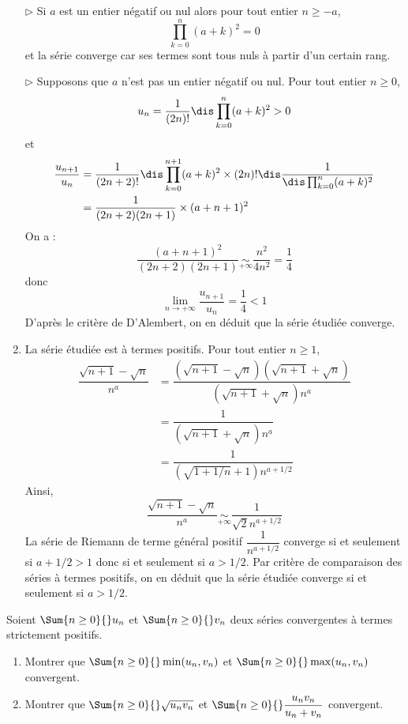 \documentclass[a4paper,twoside,french,10pt]{VcCours}
\begin{document}
\begin{enumerate}
\medskip

\noindent $\rhd$ Si $a$ est un entier négatif ou nul alors pour tout entier $n \geq -a$,
$$ \prod_{k=0}^n (a+k)^2 = 0$$
et la série converge car ses termes sont tous nuls à partir d'un certain rang.

\medskip

\noindent $\rhd$ Supposons que $a$ n'est pas un entier négatif ou nul. Pour tout entier $n \geq 0$,
$$ u_n = \dfrac{1}{(2n)!} \dis \prod_{k=0}^n (a+k)^2 >0$$
et 
\begin{align*}
\dfrac{u_{n+1}}{u_n} & = \dfrac{1}{(2n+2)!} \dis \prod_{k=0}^{n+1} (a+k)^2 \times (2n)! \dis \dfrac{1}{\dis \prod_{k=0}^n (a+k)^2} \\
& = \dfrac{1}{(2n+2)(2n+1)} \times (a+n+1)^2 
\end{align*}
On a :
$$ \dfrac{(a+n+1)^2}{(2n+2)(2n+1)} \underset{+ \infty}{\sim} \dfrac{n^2}{4n^2} = \dfrac{1}{4}$$
donc 
$$ \lim_{n \rightarrow + \infty} \dfrac{u_{n+1}}{u_n} = \dfrac{1}{4} <1$$
D'après le critère de D'Alembert, on en déduit que la série étudiée converge.
\item La série étudiée est à termes positifs. Pour tout entier $n \geq 1$,
\begin{align*}
 \dfrac{\sqrt{n+1}-\sqrt{n}}{n^a} & =  \dfrac{(\sqrt{n+1}-\sqrt{n})(\sqrt{n+1}+ \sqrt{n})}{(\sqrt{n+1}+ \sqrt{n}) n^a} \\
 & = \dfrac{1}{(\sqrt{n+1}+ \sqrt{n}) n^a} \\
 & =\dfrac{1}{(\sqrt{1+1/n}+ 1) n^{a+1/2}} 
\end{align*}
Ainsi,
$$  \dfrac{\sqrt{n+1}-\sqrt{n}}{n^a} \underset{+ \infty}{\sim} \dfrac{1}{ \sqrt{2} n^{a+1/2}} $$
La série de Riemann de terme général positif $\dfrac{1}{n^{a+1/2}}$ converge si et seulement si $a+1/2>1$ donc si et seulement si $a>1/2$. Par critère de comparaison des séries à termes positifs, on en déduit que la série étudiée converge si et seulement si $a> 1/2$.
\end{enumerate}

\medskip


\begin{Exercice}{} Soient $\Sum{n \geq 0}{} u_n$ et $\Sum{n \geq 0}{} v_n$ deux séries convergentes à termes strictement positifs.
\begin{enumerate}
\item Montrer que $\Sum{n \geq 0}{} \min(u_n,v_n)$ et $\Sum{n \geq 0}{} \max(u_n,v_n)$ convergent.
\item Montrer que $\Sum{n \geq 0}{} \sqrt{u_n v_n}$ et $\Sum{n \geq 0}{} \dfrac{u_n v_n}{u_n+v_n}$ convergent.
\end{enumerate}
\end{Exercice}
\end{document}
